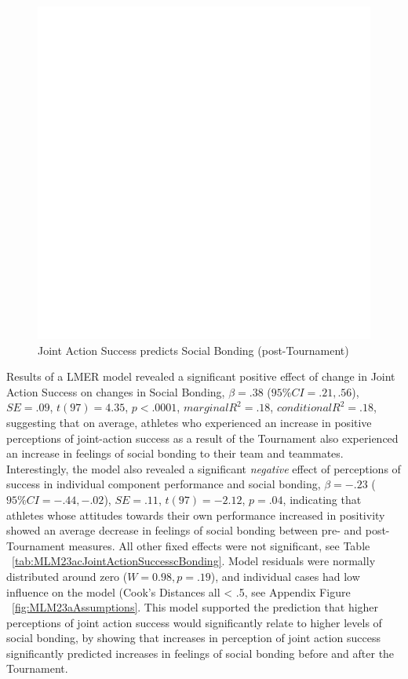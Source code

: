 \begin{landscape}
\begin{figure}[htbp]
\includegraphics[width = \linewidth]{images/jasBondDeltaBasicXY.pdf}
  \caption{Joint Action Success predicts Social Bonding (post-Tournament)}
  \label{fig:jasBondDeltaBasicXY}
\end{figure}



Results of a LMER model revealed a significant positive effect of change in Joint Action Success on changes in Social Bonding, $\beta = .38$ ($95\% CI =  .21, .56$), $SE = .09$, $t(97) = 4.35$, $p < .0001$, $marginal R^2 = .18$, $conditional R^2 = .18$, suggesting that on average, athletes who experienced an increase in positive perceptions of joint-action success as a result of the Tournament also experienced an increase in feelings of social bonding to their team and teammates.  Interestingly, the model also revealed a significant \textit{negative} effect of perceptions of success in individual component performance and social bonding, $\beta = -.23$ ($95\% CI =  -.44, -.02$), $SE = .11$, $t(97) = -2.12$, $p = .04$, indicating that athletes whose attitudes towards their own performance increased in positivity showed an average decrease in feelings of social bonding between pre- and post-Tournament measures. All other fixed effects were not significant, see Table ~\ref{tab:MLM23acJointActionSuccesscBonding}. Model residuals were normally distributed around zero ($W = 0.98, p = .19$), and individual cases had low influence on the model (Cook's Distances all < .5, see Appendix Figure ~\ref{fig:MLM23aAssumptions}.  This model supported the prediction that higher perceptions of joint action success would significantly relate to higher levels of social bonding, by showing that increases in perception of joint action success significantly predicted increases in feelings of social bonding before and after the Tournament.



\end{landscape}
